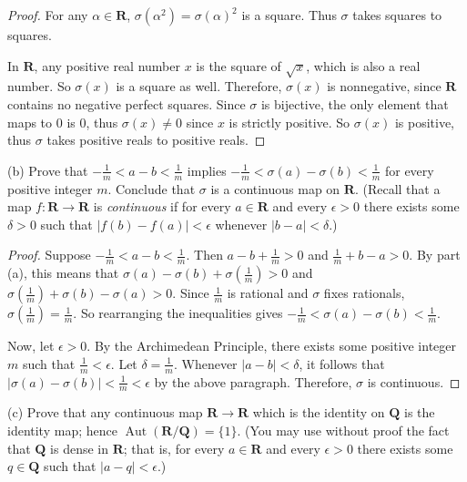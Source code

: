 \documentclass[10pt]{article}
\newcommand{\R}{\mathbf{R}}
\DeclareMathOperator*{\Aut}{Aut}
\begin{document}
\begin{enumerate}
\begin{proof}

For any $\alpha \in \R$, $\sigma(\alpha^2) = \sigma(\alpha)^2$ is a square.  Thus $\sigma$ takes squares to squares.

In $\R$, any positive real number $x$ is the square of $\sqrt{x}$, which is also a real number.  So $\sigma(x)$ is a square as well.  Therefore, $\sigma(x)$ is nonnegative, since $\R$ contains no negative perfect squares.  Since $\sigma$ is bijective, the only element that maps to $0$ is $0$, thus $\sigma(x) \neq 0$ since $x$ is strictly positive.  So $\sigma(x)$ is positive, thus $\sigma$ takes positive reals to positive reals.

\end{proof}

(b) Prove that $-\frac1m < a-b < \frac1m$ implies $-\frac1m < \sigma(a)-\sigma(b) < \frac1m$ for every positive integer $m$.  Conclude that $\sigma$ is a continuous map on $\mathbf{R}$.  (Recall that a map $f:\mathbf{R} \rightarrow \mathbf{R}$ is \emph{continuous} if for every $a \in \mathbf{R}$ and every $\epsilon>0$ there exists some $\delta>0$ such that $|f(b)-f(a)|<\epsilon$ whenever $|b-a|<\delta$.)

\begin{proof}

Suppose $-\frac1m < a-b < \frac1m$.  Then $a-b+ \frac1m > 0$ and $\frac1m + b - a > 0$.  By part (a), this means that $\sigma(a) - \sigma(b) + \sigma(\frac1m) > 0$ and $\sigma(\frac1m) + \sigma(b) - \sigma(a) > 0$.  Since $\frac1m$ is rational and $\sigma$ fixes rationals, $\sigma(\frac1m) = \frac1m$.  So rearranging the inequalities gives $-\frac1m < \sigma(a) - \sigma(b) < \frac1m$.

Now, let $\epsilon > 0$.  By the Archimedean Principle, there exists some positive integer $m$ such that $\frac1m < \epsilon$.  Let $\delta = \frac1m$.  Whenever $|a-b| < \delta$, it follows that $|\sigma(a) - \sigma(b)| < \frac1m < \epsilon$ by the above paragraph.  Therefore, $\sigma$ is continuous.

\end{proof}

(c) Prove that any continuous map $\mathbf{R} \rightarrow \mathbf{R}$ which is the identity on $\mathbf{Q}$ is the identity map; hence $\Aut(\mathbf{R}/\mathbf{Q})=\{1\}$.  (You may use without proof the fact that $\mathbf{Q}$ is dense in $\mathbf{R}$; that is, for every $a \in \mathbf{R}$ and every $\epsilon>0$ there exists some $q \in \mathbf{Q}$ such that $|a-q|<\epsilon$.)


\end{enumerate}
\end{document}
